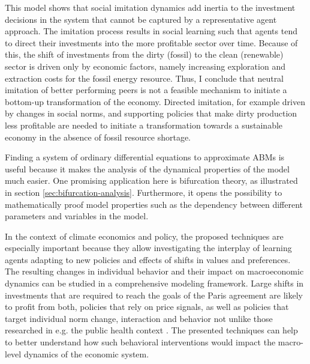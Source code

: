 This model shows that social imitation dynamics add inertia to the investment decisions in the system that cannot be captured by a representative agent approach.
The imitation process results in social learning such that agents tend to direct their investments into the more profitable sector over time.
Because of this, the shift of investments from the dirty (fossil) to the clean (renewable) sector is driven only by economic factors, namely increasing exploration and extraction costs for the fossil energy resource.
Thus, I conclude that neutral imitation of better performing peers is not a feasible mechanism to initiate a bottom-up transformation of the economy. Directed imitation, for example driven by changes in social norms, and supporting policies that make dirty production less profitable are needed to initiate a transformation towards a sustainable economy in the absence of fossil resource shortage.

Finding a system of ordinary differential equations to approximate ABMs is useful because it makes the analysis of the dynamical properties of the model much easier. One promising application here is bifurcation theory, as illustrated in section \ref{sec:bifurcation-analysis}.
Furthermore, it opens the possibility to mathematically proof model properties such as the dependency between different parameters and variables in the model.

In the context of climate economics and policy, the proposed techniques are especially important because they allow investigating the interplay of learning agents adapting to new policies and effects of shifts in values and preferences. The resulting changes in individual behavior and their impact on macroeconomic dynamics can be studied in a comprehensive modeling framework. 
Large shifts in investments that are required to reach the goals of the Paris agreement are likely to profit from both, policies that rely on price signals, as well as policies that target individual norm change, interaction and behavior not unlike those researched in e.g. the public health context \cite{Zhang2016, Zhang2015, Centola2011}. The presented techniques can help to better understand how such behavioral interventions would impact the macro-level dynamics of the economic system.


